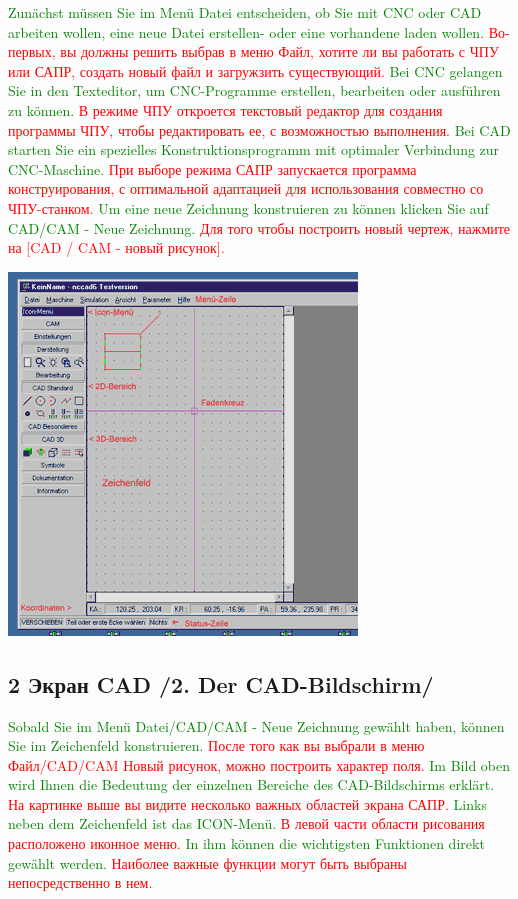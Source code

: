 \documentclass[14pt,a4paper]{book}
\newcommand{\keys}[1]{[#1]}
\newcommand{\DE}[1]{\textcolor{green}{#1}}
\newcommand{\RU}[1]{\textcolor{red}{#1}}
\newcommand{\TRsubsection}[2]{\subsection{#2 /#1/}}
\begin{document}
\DE{Zunächst müssen Sie im Menü Datei entscheiden, ob Sie mit CNC oder CAD arbeiten 
wollen, eine neue Datei erstellen- oder eine vorhandene laden wollen.}
\RU{Во-первых, вы должны решить выбрав в меню Файл, хотите ли вы работать с ЧПУ
или САПР, создать новый файл и загружзить существующий.}
\DE{Bei CNC 
gelangen Sie in den Texteditor, um CNC-Programme erstellen, bearbeiten oder 
ausführen zu können.}
\RU{В режиме ЧПУ откроется текстовый редактор для создания программы ЧПУ, чтобы
редактировать ее, с возможностью выполнения.}
\DE{Bei CAD starten Sie ein spezielles Konstruktionsprogramm 
mit optimaler Verbindung zur CNC-Maschine.}
\RU{При выборе режима САПР запускается программа конструирования, с оптимальной
адаптацией для использования совместно со ЧПУ-станком.} 
\DE{Um eine neue Zeichnung konstruieren zu können klicken Sie auf CAD/CAM - Neue 
Zeichnung.}
\RU{Для того чтобы построить новый чертеж, нажмите на \keys{CAD / CAM - новый
рисунок}.}

\includegraphics{pic/Kons2.png}
\TRsubsection{2. Der CAD-Bildschirm}{2 Экран CAD}

\DE{Sobald Sie im Menü Datei/CAD/CAM - Neue Zeichnung gewählt haben, können Sie
im Zeichenfeld konstruieren.}
\RU{После того как вы выбрали в меню Файл/CAD/CAM Новый рисунок, можно построить
характер поля.}
\DE{Im Bild oben wird Ihnen die Bedeutung der
einzelnen Bereiche des CAD-Bildschirms erklärt.}
\RU{На картинке выше вы видите несколько важных областей экрана САПР.}
\DE{Links neben dem Zeichenfeld ist
das ICON-Menü.}
\RU{В левой части области рисования расположено иконное меню.}
\DE{In ihm können die wichtigsten Funktionen direkt gewählt werden.}
\RU{Наиболее важные функции могут быть выбраны непосредственно в нем.} 
\end{document}
